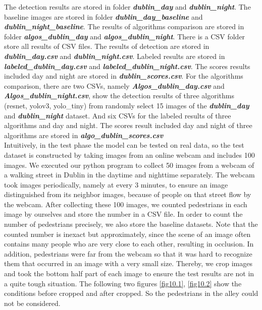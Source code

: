\documentclass[runningheads]{llncs}
\begin{document}
The detection results are stored in folder \textit{\textbf{dublin\_day}} 
and \textit{\textbf{dublin\_night}}. The baseline images are stored in folder \textit{\textbf{dublin\_day\_baseline}} and \textit{\textbf{dublin\_night\_baseline}}. The results of algorithms comparison are stored in folder \textit{\textbf{algos\_dublin\_day}} and \textit{\textbf{algos\_dublin\_night}}. There is a CSV folder store all results of CSV files. The results of detection are stored in \textit{\textbf{dublin\_day.csv}} and \textit{\textbf{dublin\_night.csv}}. Labeled results are stored in \textit{\textbf{labeled\_dublin\_day.csv}} and \textit{\textbf{labeled\_dublin\_night.csv}}. The scores results included day and night are stored in \textit{\textbf{dublin\_scores.csv}}. For the algorithms comparison, there are two CSVs, namely \textit{\textbf{Algos\_dublin\_day.csv}} and \textit{\textbf{Algos\_dublin\_night.csv}}, show the detection results of three algorithms (resnet, yolov3, yolo\_tiny) from randomly select 15 images of the \textit{\textbf{dublin\_day}} and \textit{\textbf{dublin\_night}} dataset. And six CSVs for the labeled results of three algorithms and day and night. The scores result included day and night of three algorithms are stored in \textit{\textbf{algo\_dublin\_scores.csv}}
\\

Intuitively, in the test phase the model can be tested on real data, so the test dataset is constructed by taking images from an online webcam and includes 100 images. We executed our python program to collect 50 images from a webcam of a walking street in Dublin in the daytime and nighttime separately. The webcam took images periodically, namely at every 3 minutes, to ensure an image distinguished from its neighbor images, because of people on that street flow by the webcam. After collecting these 100 images, we counted pedestrians in each image by ourselves and store the number in a CSV file. In order to count the number of pedestrians precisely, we also store the baseline datasets. Note that the counted number is inexact but approximately, since the scene of an image often contains many people who are very close to each other, resulting in occlusion. In addition, pedestrians were far from the webcam so that it was hard to recognize them that occurred in an image with a very small size. Thereby, we crop images and took the bottom half part of each image to ensure the test results are not in a quite tough situation. The following two figures \ref{fig10.1}, \ref{fig10.2} show the conditions before cropped and after cropped. So the pedestrians in the alley could not be considered. 
\end{document}
